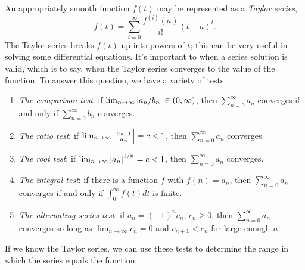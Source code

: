 \documentclass[12pt]{book}
\begin{document}
An appropriately smooth function $f(t)$ may be represented as a 
\emph{Taylor series},
\begin{dmath*}
  \boxed{f(t)=\sum_{i=0}^\infty \frac{f^{(i)}(a)}{i!}(t-a)^i}.
\end{dmath*}
The Taylor series breaks $f(t)$ up into powers of $t$; this can be
very useful in solving some differential equations.  It's important to when
a series solution is valid, which is to say, when the Taylor series
converges to the value of the function. To answer this question, we have
a variety of tests:
\begin{enumerate}
\item \emph{The comparison test}: if $\lim_{n \rightarrow \infty}
  \abs{a_n/b_n} \in (0,\infty)$, then $\sum_{n=0}^\infty a_n$
  converges if and only if $\sum_{n=0}^\infty b_n$ converges.
\item \emph{The ratio test}: if
  $\lim_{n\rightarrow\infty}\abs{\frac{a_{n+1}}{a_n}}=c < 1$, then
  $\sum_{n=0}^\infty a_n$ converges.
\item \emph{The root test}: if $\lim_{n\rightarrow\infty}\abs{a_n}^{1/n}=c < 1$,
  then $\sum_{n=0}^\infty a_n$ converges.
\item \emph{The integral test}: if there is a function $f$ with
  $f(n)=a_n$, then $\sum_{n=0}^\infty a_n$ converges if and only if
  $\int_0^\infty f(t) dt$ is finite.
\item \emph{The alternating series test}: if $a_n = (-1)^n c_n$, $c_n \geq
  0$, then $\sum_{n=0}^\infty a_n$ converges so long as
  $\lim_{n\rightarrow\infty}c_n=0$ and $c_{n+1} < c_n$ for large
  enough $n$.
\end{enumerate}
If we know the Taylor series, we can use these tests to determine the range
in which the series equals the function.

\end{document}

